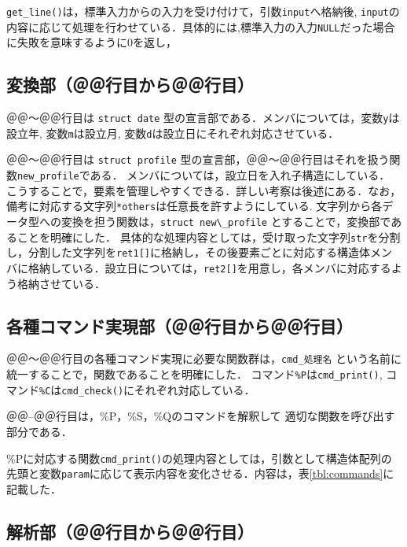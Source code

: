 \documentclass[a4j,11pt]{jarticle}
\begin{document}
\verb|get_line()|は，標準入力からの入力を受け付けて，引数\verb|input|へ格納後, \verb|input|の内容に応じて処理を行わせている．具体的には,標準入力の入力\verb|NULL|だった場合に失敗を意味するように$0$を返し，
\subsection{変換部（＠＠行目から＠＠行目）}

＠＠〜＠＠行目は \verb|struct date| 型の宣言部である．メンバについては，変数\verb|y|は設立年, 変数\verb|m|は設立月, 変数\verb|d|は設立日にそれぞれ対応させている．

＠＠〜＠＠行目は \verb|struct profile| 型の宣言部，＠＠〜＠＠行目はそれを扱う関数\verb|new_profile|である．
メンバについては，設立日を入れ子構造にしている．
こうすることで，要素を管理しやすくできる．詳しい考察は後述にある．なお，備考に対応する文字列\verb|*others|は任意長を許すようにしている. 
文字列から各データ型への変換を担う関数は，\verb|struct new\_profile| とすることで，変換部であることを明確にした．
具体的な処理内容としては，受け取った文字列\verb|str|を分割し，分割した文字列を\verb|ret1[]|に格納し，その後要素ごとに対応する構造体メンバに格納している．設立日については，\verb|ret2[]|を用意し，各メンバに対応するよう格納させている．

\subsection{各種コマンド実現部（＠＠行目から＠＠行目）}
＠＠〜＠＠行目の各種コマンド実現に必要な関数群は，\verb|cmd_処理名| という名前に統一することで，関数であることを明確にした．
コマンド\verb|%P|は\verb|cmd_print()|, コマンド\verb|%C|は\verb|cmd_check()|にそれぞれ対応している．

＠＠--＠＠行目は，\%P，\%S，\%Qのコマンドを解釈して
適切な関数を呼び出す部分である．

\%Pに対応する関数\verb|cmd_print()|の処理内容としては，引数として構造体配列の先頭と変数\verb|param|に応じて表示内容を変化させる．内容は，表\ref{tbl:commands}に記載した．
\subsection{解析部（＠＠行目から＠＠行目）}
\end{document}
